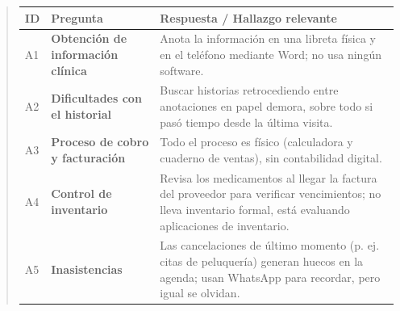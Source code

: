 \documentclass[
]{article}
\newcounter{none} %
\begin{document}
\begin{quote}
{\def\LTcaptype{none} %
\begin{longtable}[]{|
  >{\centering\arraybackslash}p{}|
  >{\raggedright\arraybackslash}p{}|
  >{\raggedright\arraybackslash}p{}|}
\hline
\begin{minipage}[b]{\linewidth}\centering
\textbf{ID}
\end{minipage} & \begin{minipage}[b]{\linewidth}\centering
\textbf{Pregunta}
\end{minipage} & \begin{minipage}[b]{\linewidth}\raggedright
\textbf{Respuesta / Hallazgo relevante}
\end{minipage} \\
\hline
\endhead
\hline
\endlastfoot
A1 & \textbf{Obtención de información clínica} &
\begin{minipage}[t]{\linewidth}\raggedright
Anota la información en una libreta física y en el teléfono mediante Word; no usa ningún software.
\end{minipage} \\
\hline
A2 & \textbf{Dificultades con el historial} &
\begin{minipage}[t]{\linewidth}\raggedright
Buscar historias retrocediendo entre anotaciones en papel demora, sobre todo si pasó tiempo desde la última visita.
\end{minipage} \\
\hline
A3 & \textbf{Proceso de cobro y facturación} &
\begin{minipage}[t]{\linewidth}\raggedright
Todo el proceso es físico (calculadora y cuaderno de ventas), sin contabilidad digital.
\end{minipage} \\
\hline
A4 & \textbf{Control de inventario} &
\begin{minipage}[t]{\linewidth}\raggedright
Revisa los medicamentos al llegar la factura del proveedor para verificar vencimientos; no lleva inventario formal, está evaluando aplicaciones de inventario.
\end{minipage} \\
\hline
A5 & \textbf{Inasistencias} &
\begin{minipage}[t]{\linewidth}\raggedright
Las cancelaciones de último momento (p. ej. citas de peluquería) generan huecos en la agenda; usan WhatsApp para recordar, pero igual se olvidan.
\end{minipage} \\

\end{longtable}}
\end{quote}
\end{document}
